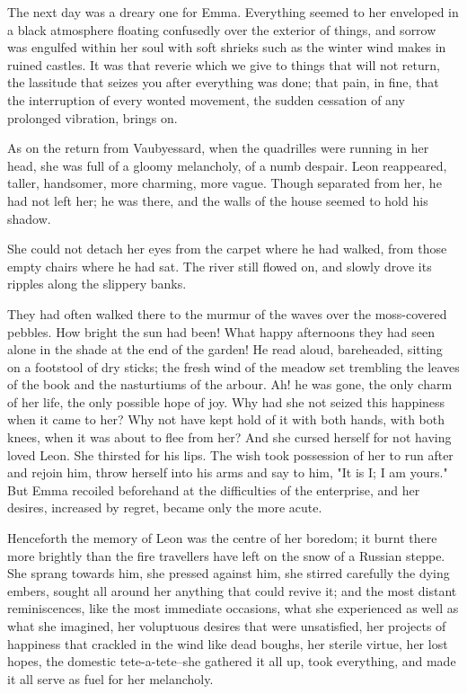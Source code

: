 \documentclass[11pt,twocolumn]{ltugboat}
\begin{document}
The next day was a dreary one for Emma. Everything seemed to her
enveloped in a black atmosphere floating confusedly over the exterior of
things, and sorrow was engulfed within her soul with soft shrieks such
as the winter wind makes in ruined castles. It was that reverie which we
give to things that will not return, the lassitude that seizes you after
everything was done; that pain, in fine, that the interruption of every
wonted movement, the sudden cessation of any prolonged vibration, brings
on.

As on the return from Vaubyessard, when the quadrilles were running in
her head, she was full of a gloomy melancholy, of a numb despair.
Leon reappeared, taller, handsomer, more charming, more vague. Though
separated from her, he had not left her; he was there, and the walls of
the house seemed to hold his shadow.

She could not detach her eyes from the carpet where he had walked, from
those empty chairs where he had sat. The river still flowed on, and
slowly drove its ripples along the slippery banks.

They had often walked there to the murmur of the waves over the
moss-covered pebbles. How bright the sun had been! What happy afternoons
they had seen alone in the shade at the end of the garden! He read
aloud, bareheaded, sitting on a footstool of dry sticks; the fresh wind
of the meadow set trembling the leaves of the book and the nasturtiums
of the arbour. Ah! he was gone, the only charm of her life, the only
possible hope of joy. Why had she not seized this happiness when it came
to her? Why not have kept hold of it with both hands, with both knees,
when it was about to flee from her? And she cursed herself for not
having loved Leon. She thirsted for his lips. The wish took possession
of her to run after and rejoin him, throw herself into his arms and
say to him, "It is I; I am yours." But Emma recoiled beforehand at the
difficulties of the enterprise, and her desires, increased by regret,
became only the more acute.

Henceforth the memory of Leon was the centre of her boredom; it burnt
there more brightly than the fire travellers have left on the snow of
a Russian steppe. She sprang towards him, she pressed against him, she
stirred carefully the dying embers, sought all around her anything
that could revive it; and the most distant reminiscences, like the most
immediate occasions, what she experienced as well as what she imagined,
her voluptuous desires that were unsatisfied, her projects of happiness
that crackled in the wind like dead boughs, her sterile virtue, her
lost hopes, the domestic tete-a-tete--she gathered it all up, took
everything, and made it all serve as fuel for her melancholy.
\end{document}
